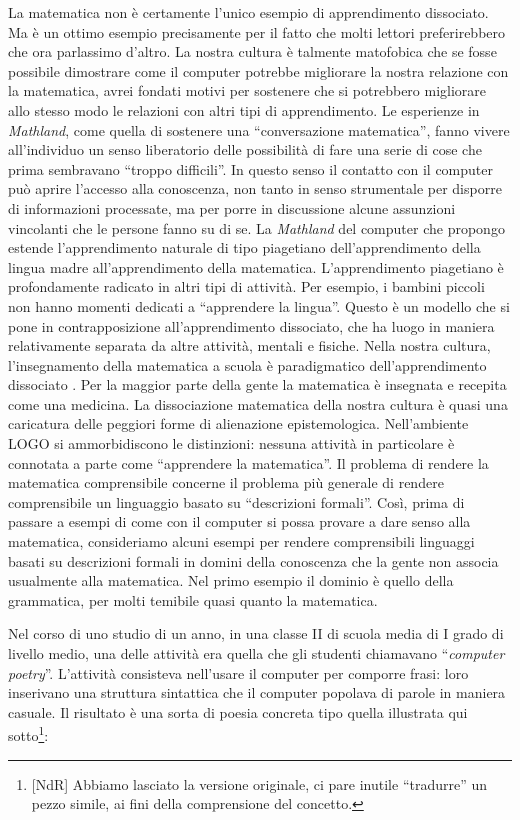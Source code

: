 La matematica non è certamente l'unico esempio di apprendimento dissociato. Ma è un ottimo esempio precisamente per il fatto che molti lettori preferirebbero che ora parlassimo d'altro. La nostra cultura è talmente  matofobica che se fosse possibile dimostrare come il computer potrebbe migliorare la nostra relazione con la matematica, avrei fondati motivi per sostenere che si potrebbero migliorare allo stesso modo le relazioni con altri tipi di apprendimento. Le esperienze in \textit{Mathland}, come quella di sostenere una “conversazione matematica”, fanno vivere all'individuo un senso liberatorio delle possibilità di fare una serie di cose che prima sembravano “troppo difficili”. In questo senso il contatto con il computer può aprire l'accesso alla conoscenza, non tanto in senso strumentale per disporre di informazioni processate, ma per porre in discussione alcune assunzioni vincolanti che le persone fanno su di se. La \textit{Mathland} del computer che propongo estende l'apprendimento naturale di tipo piagetiano dell'apprendimento della lingua madre all'apprendimento della matematica. L'apprendimento piagetiano è profondamente radicato in altri tipi di attività. Per esempio, i bambini piccoli non hanno momenti dedicati a “apprendere la lingua”.  Questo è un modello che si pone in contrapposizione all'apprendimento dissociato, che ha luogo in maniera relativamente separata da altre attività, mentali e fisiche. Nella nostra cultura, l'insegnamento della matematica a scuola è paradigmatico dell'apprendimento dissociato . Per la maggior parte della gente la matematica è insegnata e recepita come una medicina. La dissociazione matematica della nostra cultura è quasi una caricatura delle peggiori forme di alienazione epistemologica. Nell'ambiente LOGO si ammorbidiscono le distinzioni: nessuna attività in particolare è connotata a parte come “apprendere la matematica”. Il problema di rendere la matematica comprensibile concerne il problema più generale di rendere comprensibile un linguaggio basato su “descrizioni formali”. Così, prima di passare a esempi di come con il computer si possa provare a dare senso alla matematica, consideriamo alcuni esempi per rendere comprensibili linguaggi basati su descrizioni formali in domini della conoscenza che la gente non associa usualmente alla matematica. Nel primo esempio il dominio è quello della grammatica, per molti temibile quasi quanto la matematica.

Nel corso di uno studio di un anno, in una classe II di scuola  media di I grado di livello medio, una delle attività era quella che gli studenti chiamavano “\textit{computer} \textit{poetry}”. L'attività consisteva nell'usare il computer per comporre frasi: loro inserivano una struttura sintattica che il computer popolava di parole in maniera casuale. Il risultato è una sorta di poesia concreta tipo quella illustrata qui sotto\footnote{[NdR] Abbiamo lasciato la versione originale, ci pare inutile “tradurre” un pezzo simile, ai fini della comprensione del concetto.}:

